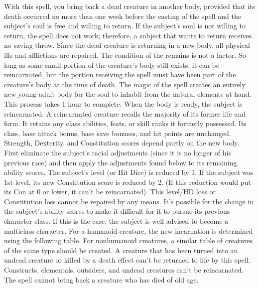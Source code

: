 With this spell, you bring back a dead creature in another body, provided that
its death occurred no more than one week before the casting of the spell and the
subject's soul is free and willing to return. If the subject's soul is not willing
to return, the spell does not work; therefore, a subject that wants to return receives
no saving throw.
Since the dead creature is returning in a new body, all physical ills and afflictions
are repaired. The condition of the remains is not a factor. So long as some small
portion of the creature's body still exists, it can be reincarnated, but the portion
receiving the spell must have been part of the creature's body at the time of death.
The magic of the spell creates an entirely new young adult body for the soul to
inhabit from the natural elements at hand. This process takes 1 hour to complete.
When the body is ready, the subject is reincarnated.
A reincarnated creature recalls the majority of its former life and form. It retains
any class abilities, feats, or skill ranks it formerly possessed. Its class, base
attack bonus, base save bonuses, and hit points are unchanged. Strength, Dexterity,
and Constitution scores depend partly on the new body. First eliminate the subject's
racial adjustments (since it is no longer of his previous race) and then apply
the adjustments found below to its remaining ability scores. The subject's level
(or Hit Dice) is reduced by 1. If the subject was 1st level, its new Constitution
score is reduced by 2. (If this reduction would put its Con at 0 or lower, it can't
be reincarnated). This level/HD loss or Constitution loss cannot be repaired by
any means.
It's possible for the change in the subject's ability scores to make it difficult
for it to pursue its previous character class. If this is the case, the subject
is well advised to become a multiclass character.
For a humanoid creature, the new incarnation is determined using the following
table. For nonhumanoid creatures, a similar table of creatures of the same type
should be created.
A creature that has been turned into an undead creature or killed by a death effect
can't be returned to life by this spell.  Constructs, elementals, outsiders, and
undead creatures can't be reincarnated. The spell cannot bring back a creature
who has died of old age.
